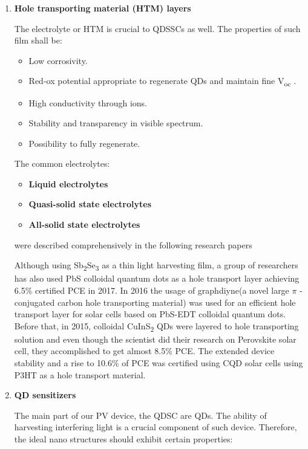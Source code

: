 \begin{enumerate}
\item \textbf{Hole transporting material (HTM) layers}

The electrolyte or HTM is crucial to QDSSCs as well. The properties of
such film shall be:

\begin{itemize}
\item
  Low corrosivity.
\item
  Red-ox potential appropriate to regenerate QDs and maintain fine
  V\textsubscript{oc} .
\item
  High conductivity through ions.
\item
  Stability and transparency in visible spectrum.
\item
  Possibility to fully regenerate. \cite{HuashangRao2018}
\end{itemize}

The common electrolytes:

\begin{itemize}
\item
  \textbf{Liquid electrolytes}
\item
  \textbf{Quasi-solid state electrolytes}
\item
  \textbf{All-solid state electrolytes}
\end{itemize}

were described comprehensively in the following research papers \cite{HuashangRao2018} \cite{Zhang2015} \cite{Song2017}

Although using Sb\textsubscript{2}Se\textsubscript{3} as a thin light
harvesting film, a group of researchers has also used PbS colloidal
quantum dots as a hole transport layer achieving 6.5\% certified PCE in 2017. \cite{Wang2017} In 2016 the usage of graphdiyne(a novel large $\pi$ -conjugated carbon hole transporting material) was used for an efficient hole transport layer for solar cells based on PbS-EDT colloidal quantum dots.\cite{MingjianYuan2016} Before that, in 2015, colloidal CuInS\textsubscript{2} QDs were layered to hole transporting solution and even though the scientist did their research on Perovskite solar cell, they accomplished to get almost 8.5\% PCE.\cite{JunZhu2015} The extended device stability and a rise to 10.6\% of PCE was certified using CQD solar cells using P3HT as a hole transport material. \cite{Zhang2016}


\item \textbf{QD sensitizers }

The main part of our PV device, the QDSC are QDs. The ability of harvesting interfering light is a crucial component of such device. \cite{Ikeda2014} Therefore, the ideal nano structures should exhibit certain properties:


\end{enumerate}

